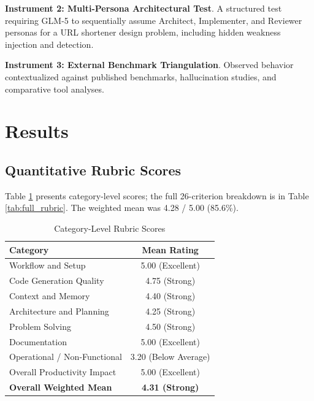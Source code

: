 \documentclass[conference]{IEEEtran}
\begin{document}
\textbf{Instrument 2: Multi-Persona Architectural Test}. A structured test requiring GLM-5 to sequentially assume Architect, Implementer, and Reviewer personas for a URL shortener design problem, including hidden weakness injection and detection.

\textbf{Instrument 3: External Benchmark Triangulation}. Observed behavior contextualized against published benchmarks, hallucination studies, and comparative tool analyses.

\section{Results}

\subsection{Quantitative Rubric Scores}
Table \ref{tab:category_scores} presents category-level scores; the full 26-criterion breakdown is in Table \ref{tab:full_rubric}. The weighted mean was 4.28 / 5.00 (85.6\%).

\begin{table}[H]
\caption{Category-Level Rubric Scores}
\label{tab:category_scores}
\centering
\begin{tabular}{lc}
\toprule
\textbf{Category} & \textbf{Mean Rating} \\
\midrule
Workflow and Setup & 5.00 (Excellent) \\
Code Generation Quality & 4.75 (Strong) \\
Context and Memory & 4.40 (Strong) \\
Architecture and Planning & 4.25 (Strong) \\
Problem Solving & 4.50 (Strong) \\
Documentation & 5.00 (Excellent) \\
Operational / Non-Functional & 3.20 (Below Average) \\
Overall Productivity Impact & 5.00 (Excellent) \\
\midrule
\textbf{Overall Weighted Mean} & \textbf{4.31 (Strong)} \\
\bottomrule
\end{tabular}
\end{table}
\end{document}
